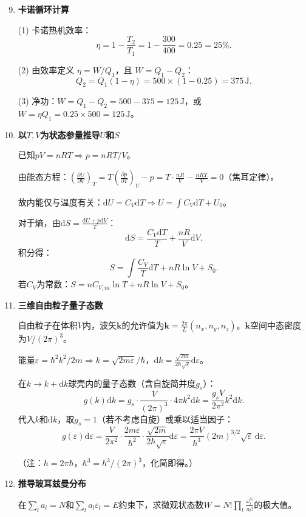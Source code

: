 \documentclass[12pt,a4paper,fontset=mac]{ctexart}
\newcommand{\kk}{\mathbf{k}}
\newcommand{\dd}{\mathrm{d}}
\newcommand{\đ}{\mathrm{đ}}
\begin{document}
\begin{enumerate}
\setcounter{enumi}{8}

\item \textbf{卡诺循环计算}

(1) 卡诺热机效率：
\[\eta=1-\frac{T_2}{T_1}=1-\frac{300}{400}=0.25=25\%.\]

(2) 由效率定义 $\eta=W/Q_1$，且 $W=Q_1-Q_2$：
\[Q_2=Q_1(1-\eta)=500\times(1-0.25)=375\,\text{J}.\]

(3) 净功：$W=Q_1-Q_2=500-375=125\,\text{J}$，或 $W=\eta Q_1=0.25\times500=125\,\text{J}$。

\item \textbf{以$T,V$为状态参量推导$U$和$S$}

已知$pV=nRT\Rightarrow p=nRT/V$。

由能态方程：$\left(\frac{\partial U}{\partial V}\right)_T=T\left(\frac{\partial p}{\partial T}\right)_V-p=T\cdot\frac{nR}{V}-\frac{nRT}{V}=0$（焦耳定律）。

故内能仅与温度有关：$\dd U=C_V\dd T \Rightarrow U=\int C_V\dd T+U_0$。

对于熵，由$\dd S=\frac{\dd U+p\dd V}{T}$：
\[\dd S=\frac{C_V\dd T}{T}+\frac{nR}{V}\dd V.\]
积分得：
\[S=\int\frac{C_V}{T}\dd T+nR\ln V+S_0.\]
若$C_V$为常数：$S=nC_{V,m}\ln T+nR\ln V+S_0$。

\item \textbf{三维自由粒子量子态数}

自由粒子在体积$V$内，波矢$\kk$的允许值为$\kk=\frac{2\pi}{L}(n_x,n_y,n_z)$。$\kk$空间中态密度为$V/(2\pi)^3$。

能量$\varepsilon=\hbar^2k^2/2m\Rightarrow k=\sqrt{2m\varepsilon}/\hbar$，$\dd k=\frac{\sqrt{2m}}{2\hbar\sqrt{\varepsilon}}\dd\varepsilon$。

在$k\to k+\dd k$球壳内的量子态数（含自旋简并度$g_s$）：
\[g(k)\dd k=g_s\cdot\frac{V}{(2\pi)^3}\cdot4\pi k^2\dd k=\frac{g_sV}{2\pi^2}k^2\dd k.\]
代入$k$和$\dd k$，取$g_s=1$（若不考虑自旋）或乘以适当因子：
\[g(\varepsilon)\dd\varepsilon=\frac{V}{2\pi^2}\cdot\frac{2m\varepsilon}{\hbar^2}\cdot\frac{\sqrt{2m}}{2\hbar\sqrt{\varepsilon}}\dd\varepsilon=\frac{2\pi V}{h^3}(2m)^{3/2}\sqrt{\varepsilon}\,\dd\varepsilon.\]

（注：$h=2\pi\hbar$，$\hbar^3=h^3/(2\pi)^3$，化简即得。）

\item \textbf{推导玻耳兹曼分布}

在$\sum_la_l=N$和$\sum_la_l\varepsilon_l=E$约束下，求微观状态数$W=N!\prod_l\frac{\omega_l^{a_l}}{a_l!}$的极大值。


\end{enumerate}
\end{document}

